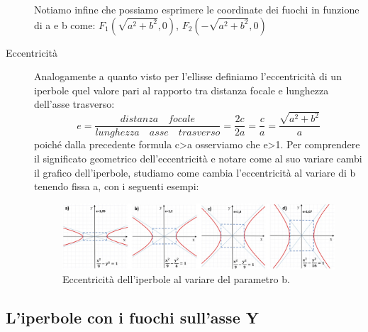 \begin{description}
Notiamo infine che possiamo esprimere le coordinate dei fuochi in funzione 
di a e b come: $ F_{1}(\sqrt{a^{2}+b^{2}}, 0) $, $ 
F_{2}(-\sqrt{a^{2}+b^{2}}, 0) $
\item [Eccentricità] Analogamente a 
quanto visto per l'ellisse definiamo l'eccentricità di un iperbole quel 
valore pari al rapporto tra distanza focale e lunghezza dell'asse trasverso:
\begin{equation}
e=\dfrac{distanza \quad focale}{lunghezza \quad asse\quad 
trasverso}=\dfrac{2c}{2a}=\dfrac{c}{a}=\dfrac{\sqrt{a^{2}+b^{2}}}{a}
\end{equation}
poiché dalla precedente formula c>a osserviamo che e>1.
Per comprendere il significato geometrico dell'eccentricità e notare come 
al suo variare cambi il grafico dell'iperbole, studiamo come cambia 
l'eccentricità al variare di b tenendo fissa a, con i seguenti esempi:
\begin{figure}[htbp]
  \centering
  \includegraphics[width=\textwidth]{img/4iperboli.jpg}
    \caption{Eccentricità dell'iperbole al variare del 
parametro b.}%
\end{figure}
\end{description}

\subsection{L'iperbole con i fuochi sull'asse Y}

